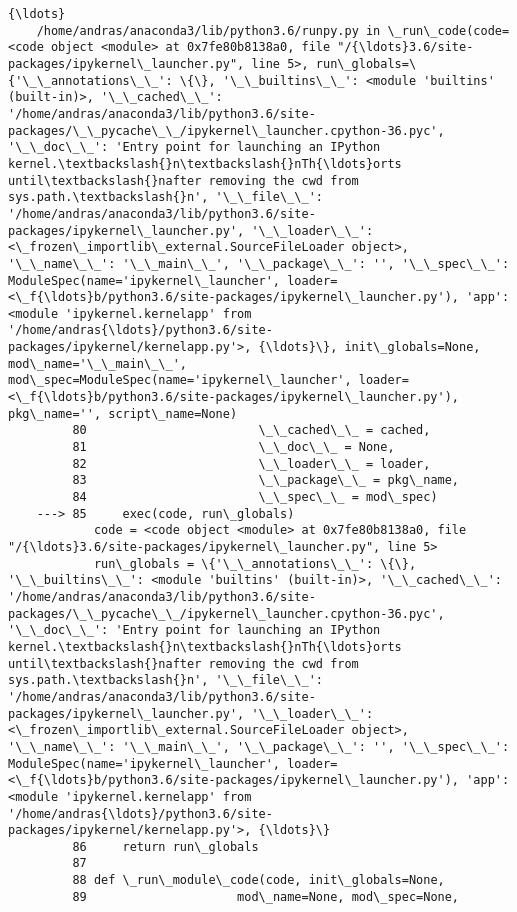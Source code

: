 \documentclass[11pt]{article}
\begin{document}
\begin{Verbatim}[commandchars=\\\{\}]
    {\ldots}
    /home/andras/anaconda3/lib/python3.6/runpy.py in \_run\_code(code=<code object <module> at 0x7fe80b8138a0, file "/{\ldots}3.6/site-packages/ipykernel\_launcher.py", line 5>, run\_globals=\{'\_\_annotations\_\_': \{\}, '\_\_builtins\_\_': <module 'builtins' (built-in)>, '\_\_cached\_\_': '/home/andras/anaconda3/lib/python3.6/site-packages/\_\_pycache\_\_/ipykernel\_launcher.cpython-36.pyc', '\_\_doc\_\_': 'Entry point for launching an IPython kernel.\textbackslash{}n\textbackslash{}nTh{\ldots}orts until\textbackslash{}nafter removing the cwd from sys.path.\textbackslash{}n', '\_\_file\_\_': '/home/andras/anaconda3/lib/python3.6/site-packages/ipykernel\_launcher.py', '\_\_loader\_\_': <\_frozen\_importlib\_external.SourceFileLoader object>, '\_\_name\_\_': '\_\_main\_\_', '\_\_package\_\_': '', '\_\_spec\_\_': ModuleSpec(name='ipykernel\_launcher', loader=<\_f{\ldots}b/python3.6/site-packages/ipykernel\_launcher.py'), 'app': <module 'ipykernel.kernelapp' from '/home/andras{\ldots}/python3.6/site-packages/ipykernel/kernelapp.py'>, {\ldots}\}, init\_globals=None, mod\_name='\_\_main\_\_', mod\_spec=ModuleSpec(name='ipykernel\_launcher', loader=<\_f{\ldots}b/python3.6/site-packages/ipykernel\_launcher.py'), pkg\_name='', script\_name=None)
         80                        \_\_cached\_\_ = cached,
         81                        \_\_doc\_\_ = None,
         82                        \_\_loader\_\_ = loader,
         83                        \_\_package\_\_ = pkg\_name,
         84                        \_\_spec\_\_ = mod\_spec)
    ---> 85     exec(code, run\_globals)
            code = <code object <module> at 0x7fe80b8138a0, file "/{\ldots}3.6/site-packages/ipykernel\_launcher.py", line 5>
            run\_globals = \{'\_\_annotations\_\_': \{\}, '\_\_builtins\_\_': <module 'builtins' (built-in)>, '\_\_cached\_\_': '/home/andras/anaconda3/lib/python3.6/site-packages/\_\_pycache\_\_/ipykernel\_launcher.cpython-36.pyc', '\_\_doc\_\_': 'Entry point for launching an IPython kernel.\textbackslash{}n\textbackslash{}nTh{\ldots}orts until\textbackslash{}nafter removing the cwd from sys.path.\textbackslash{}n', '\_\_file\_\_': '/home/andras/anaconda3/lib/python3.6/site-packages/ipykernel\_launcher.py', '\_\_loader\_\_': <\_frozen\_importlib\_external.SourceFileLoader object>, '\_\_name\_\_': '\_\_main\_\_', '\_\_package\_\_': '', '\_\_spec\_\_': ModuleSpec(name='ipykernel\_launcher', loader=<\_f{\ldots}b/python3.6/site-packages/ipykernel\_launcher.py'), 'app': <module 'ipykernel.kernelapp' from '/home/andras{\ldots}/python3.6/site-packages/ipykernel/kernelapp.py'>, {\ldots}\}
         86     return run\_globals
         87 
         88 def \_run\_module\_code(code, init\_globals=None,
         89                     mod\_name=None, mod\_spec=None,
    

\end{Verbatim}
\end{document}
